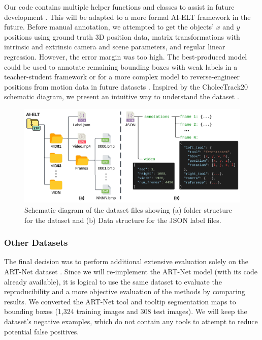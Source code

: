 Our code contains multiple helper functions and classes to assist in future development \cite{choudhry_omarioscmsc-surgical-tool-tracking_2024}. This will be adapted to a more formal AI-ELT framework in the future. Before manual annotation, we attempted to get the objects' $x$ and $y$ positions using ground truth 3D position data, matrix transformations with intrinsic and extrinsic camera and scene parameters, and regular linear regression. However, the error margin was too high. The best-produced model could be used to annotate remaining bounding boxes with weak labels in a teacher-student framework or for a more complex model to reverse-engineer positions from motion data in future datasets \cite{teevno_semi-supervised_2023}. Inspired by the CholecTrack20 schematic diagram, we present an intuitive way to understand the dataset \cite{nwoye_cholectrack20_2023}.

\begin{figure}[htbp]
    \centering
    \vspace*{-2mm}
    \includegraphics[width=\linewidth]{schematic_diagram.png}
    \vspace*{-7.5mm}
    \caption{Schematic diagram of the dataset files showing (a) folder structure for the dataset and (b) Data structure for the JSON label files.}
    \vspace*{-5mm}
    \label{fig:schematic_diagram}
\end{figure}

\subsubsection{Other Datasets}

The final decision was to perform additional extensive evaluation solely on the ART-Net dataset \cite{hasan_detection_2021}. Since we will re-implement the ART-Net model (with its code already available), it is logical to use the same dataset to evaluate the reproducibility and a more objective evaluation of the methods by comparing results. We converted the ART-Net tool and tooltip segmentation maps to bounding boxes (1,324 training images and 308 test images). We will keep the dataset's negative examples, which do not contain any tools to attempt to reduce potential false positives.

